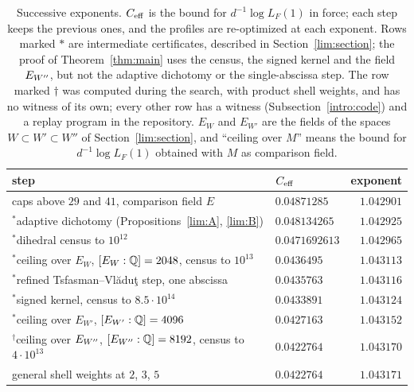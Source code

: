 \begin{table}[htbp]
\centering\small
\caption{Successive exponents. $C_{\rm eff}$ is the bound for
$d^{-1}\log L_F(1)$ in force; each step keeps the previous ones, and the
profiles are re-optimized at each exponent. Rows marked $*$ are intermediate
certificates, described in Section~\ref{lim:section}; the proof of
Theorem~\ref{thm:main} uses the census, the signed kernel and the field
$E_{W''}$, but not the adaptive dichotomy or the single-abscissa step. The row
marked $\dagger$ was computed during the search, with product shell weights,
and has no witness of its own; every other row has a witness
(Subsection~\ref{intro:code}) and a replay program in the repository.
$E_W$ and $E_{W'}$ are the fields of the spaces $W\subset W'\subset W''$ of
Section~\ref{lim:section}, and ``ceiling over $M$'' means the bound for
$d^{-1}\log L_F(1)$ obtained with $M$ as comparison field.}
\label{intro:table-steps}
\begin{tabular}{@{}p{8.6cm}lr@{}}
\toprule
step & $C_{\rm eff}$ & exponent\\
\midrule
caps above $29$ and $41$, comparison field $E$ & $0.04871285$ & $1.042901$\\
${}^*$adaptive dichotomy (Propositions~\ref{lim:A}, \ref{lim:B}) & $0.048134265$ & $1.042925$\\
${}^*$dihedral census to $10^{12}$ & $0.0471692613$ & $1.042965$\\
${}^*$ceiling over $E_W$, $[E_W:\mathbb Q]=2048$, census to $10^{13}$ & $0.0436495$ & $1.043113$\\
${}^*$refined Tsfasman--Vl\u{a}du\c{t} step, one abscissa & $0.0435763$ & $1.043116$\\
${}^*$signed kernel, census to $8.5\cdot10^{14}$ & $0.0433891$ & $1.043124$\\
${}^*$ceiling over $E_{W'}$, $[E_{W'}:\mathbb Q]=4096$ & $0.0427163$ & $1.043152$\\
${}^\dagger$ceiling over $E_{W''}$, $[E_{W''}:\mathbb Q]=8192$, census to $4\cdot10^{13}$ & $0.0422764$ & $1.043170$\\
general shell weights at $2$, $3$, $5$ & $0.0422764$ & $1.043171$\\
\bottomrule
\end{tabular}
\end{table}

